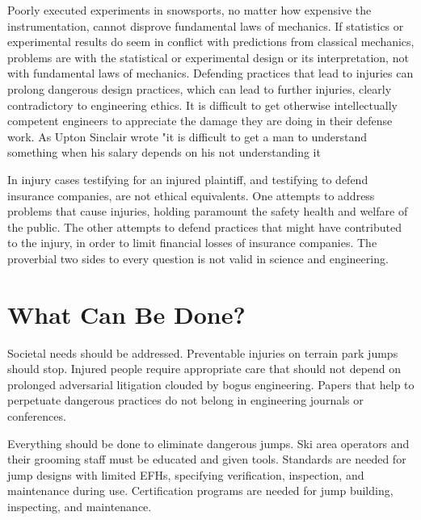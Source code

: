 \documentclass[smallextended]{svjour3}       %
\begin{document}
Poorly executed experiments in snowsports, no matter how
expensive the instrumentation, cannot disprove fundamental laws of mechanics. If statistics or experimental results do seem in
conflict with predictions from classical mechanics, problems are with the statistical or experimental design or its interpretation, 
not with fundamental laws of mechanics. Defending practices that lead to injuries can prolong dangerous design practices, which can
lead to further injuries, clearly contradictory to engineering
ethics. It is difficult to get otherwise intellectually competent engineers to appreciate the damage they are doing in their defense work.  As Upton Sinclair wrote "it is difficult to get a man to understand something when his salary depends on his not understanding it \cite{Sinclair1994}


In injury cases testifying for an injured plaintiff, and testifying to defend insurance companies, are not ethical equivalents. One attempts to address
problems that cause injuries, holding paramount the safety health and welfare
of the public. The other attempts to defend practices that might have
contributed to the injury, in order to limit financial losses of insurance
companies. The proverbial two sides to every question is not valid in science
and engineering.



\section{What Can Be Done?}
\label{sec:action}
%
Societal needs should be addressed. Preventable injuries on terrain park jumps should stop. Injured people require appropriate care that should not depend on prolonged adversarial litigation clouded by bogus engineering. Papers that help to perpetuate dangerous practices do not belong in engineering journals or conferences. 

Everything should be done to eliminate dangerous jumps.  Ski area operators and their grooming staff must be educated and given tools. Standards are needed for jump designs with limited EFHs, specifying verification, inspection, and maintenance during use. Certification programs are needed for jump building, inspecting, and maintenance.    
\end{document}
